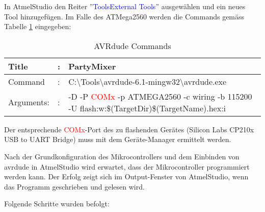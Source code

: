 In AtmelStudio den Reiter ''\textcolor{blue}{Tools\textrightarrow External Tools}'' ausgewählen und ein neues Tool hinzugefügen. Im Falle des ATMega2560 werden die Commands gemäss Tabelle \ref{tab:AVRdude_commands} eingegeben:

\begin{table}[h!]
\center
\begin{tabularx}{\textwidth}{|l|l|X|}
\hline
Title & : & PartyMixer \\
\hline
Command & : & C:\textbackslash Tools\textbackslash avrdude-6.1-mingw32\textbackslash avrdude.exe \\
\hline
Arguments: & : & -D -P \textcolor{red}{ COMx} -p ATMEGA2560 -c wiring -b 115200 -U flash:w:\$(TargetDir)\$(TargetName).hex:i\\
\hline
\end{tabularx}
\caption{AVRdude Commands \cite{meier_mc1-skript_2017}}
\label{tab:AVRdude_commands}
\end{table}

Der entsprechende \textcolor{red}{COMx}-Port des zu flashenden Gerätes (Silicon Labs CP210x USB to UART Bridge) muss mit dem Geräte-Manager ermittelt werden.

Nach der Grundkonfiguration des Mikrocontrollers und dem Einbinden von avrdude in AtmelStudio wird erwartet, dass der Mikrocontroller programmiert werden kann. Der Erfolg zeigt sich im Output-Fenster von AtmelStudio, wenn das Programm geschrieben und gelesen wird.

Folgende Schritte wurden befolgt:

